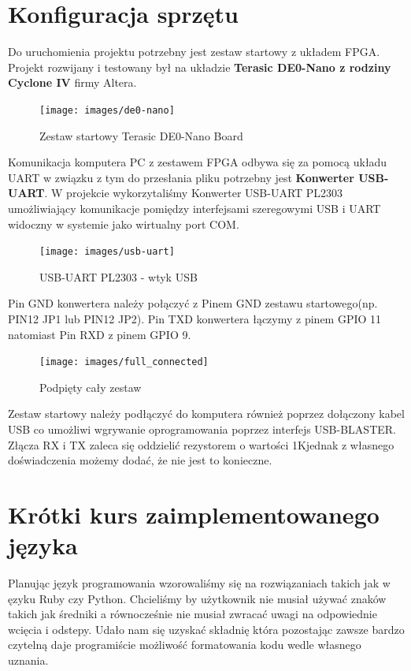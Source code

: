 \section{Konfiguracja sprzętu}
Do uruchomienia projektu potrzebny jest zestaw startowy z układem FPGA. Projekt rozwijany i testowany był na układzie \textbf{Terasic DE0-Nano z rodziny Cyclone IV} firmy Altera.

\begin{figure}[h]
\begin{center}
\texttt{[image: images/de0-nano]}
\caption{Zestaw startowy Terasic DE0-Nano Board}
\end{center}
\end{figure}

Komunikacja komputera PC z zestawem FPGA odbywa się za pomocą układu UART w związku z tym do przesłania pliku potrzebny jest \textbf{Konwerter USB-UART}. W projekcie wykorzytaliśmy Konwerter USB-UART PL2303 umożliwiający komunikacje pomiędzy interfejsami szeregowymi USB i UART widoczny w systemie jako wirtualny port COM.
\begin{figure}[!ht]
\centering
\texttt{[image: images/usb-uart]}
\caption{USB-UART PL2303 - wtyk USB}
\end{figure}
Pin GND konwertera należy połączyć z Pinem GND zestawu startowego(np. PIN12 JP1 lub PIN12 JP2). Pin TXD konwertera łączymy z pinem GPIO 11 natomiast Pin RXD z pinem GPIO 9.
\begin{figure}[!ht]
\centering
\texttt{[image: images/full\_connected]}
\caption{Podpięty cały zestaw}
\end{figure}
Zestaw startowy należy podłączyć do komputera również poprzez dołączony kabel USB co umożliwi wgrywanie oprogramowania poprzez interfejs USB-BLASTER. Złącza RX i TX zaleca się oddzielić rezystorem o wartości 1K\ohm\space jednak z własnego doświadczenia możemy dodać, że nie jest to konieczne.
\section{Krótki kurs zaimplementowanego języka}
Planując język programowania wzorowaliśmy się na rozwiązaniach takich jak w ęzyku Ruby czy Python. Chcieliśmy by użytkownik nie musiał używać znaków takich jak średniki a równocześnie nie musiał zwracać uwagi na odpowiednie wcięcia i odstepy. Udało nam się uzyskać składnię która pozostając zawsze bardzo czytelną daje programiście możliwość formatowania kodu wedle własnego uznania.
